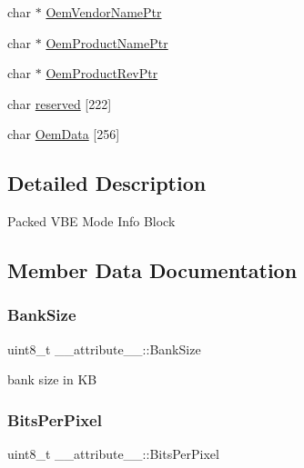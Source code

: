 \begin{DoxyCompactItemize}
char $\ast$ \hyperlink{struct____attribute_____af0c799aee5a7aa7a1514217508e3f3ed}{Oem\+Vendor\+Name\+Ptr}
\item 
char $\ast$ \hyperlink{struct____attribute_____acbda83ed0529a356cecb49583996960f}{Oem\+Product\+Name\+Ptr}
\item 
char $\ast$ \hyperlink{struct____attribute_____ab4343da5f260d2438dc5c64feb9636bf}{Oem\+Product\+Rev\+Ptr}
\item 
char \hyperlink{struct____attribute_____a009ec7baf4ee08c85717a2d5c63a277b}{reserved} \mbox{[}222\mbox{]}
\item 
char \hyperlink{struct____attribute_____a1001bc87085a4c9669331941dfd3be59}{Oem\+Data} \mbox{[}256\mbox{]}
\end{DoxyCompactItemize}


\subsection{Detailed Description}
Packed V\+BE Mode Info Block 

\subsection{Member Data Documentation}
\hypertarget{struct____attribute_____aa1307567cbc12f9c5c724b7457be14ad}{}\label{struct____attribute_____aa1307567cbc12f9c5c724b7457be14ad} 
\subsubsection{\texorpdfstring{Bank\+Size}{BankSize}}
{\footnotesize\ttfamily uint8\+\_\+t \+\_\+\+\_\+attribute\+\_\+\+\_\+\+::\+Bank\+Size}



bank size in KB 

\hypertarget{struct____attribute_____abd9c59af53589a54188bb57ada5c5f26}{}\label{struct____attribute_____abd9c59af53589a54188bb57ada5c5f26} 
\subsubsection{\texorpdfstring{Bits\+Per\+Pixel}{BitsPerPixel}}
{\footnotesize\ttfamily uint8\+\_\+t \+\_\+\+\_\+attribute\+\_\+\+\_\+\+::\+Bits\+Per\+Pixel}



